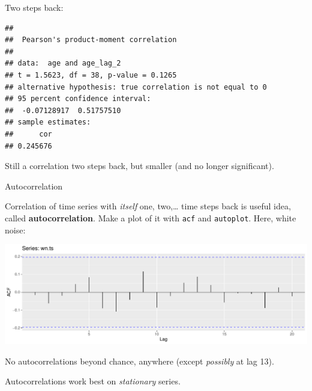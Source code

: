 \documentclass[
  ignorenonframetext,
]{beamer}
\newenvironment{Shaded}{\begin{snugshade}}{\end{snugshade}}
\newcommand{\DataTypeTok}[1]{\textcolor[rgb]{0.13,0.29,0.53}{#1}}
\newcommand{\DecValTok}[1]{\textcolor[rgb]{0.00,0.00,0.81}{#1}}
\newcommand{\KeywordTok}[1]{\textcolor[rgb]{0.13,0.29,0.53}{\textbf{#1}}}
\newcommand{\NormalTok}[1]{#1}
\newcommand{\OperatorTok}[1]{\textcolor[rgb]{0.81,0.36,0.00}{\textbf{#1}}}
\newcommand{\StringTok}[1]{\textcolor[rgb]{0.31,0.60,0.02}{#1}}
\begin{document}
\begin{frame}[fragile]{Two steps back:}
\protect\hypertarget{two-steps-back}{}

\small

\begin{Shaded}
\end{Shaded}

\begin{verbatim}
## 
##  Pearson's product-moment correlation
## 
## data:  age and age_lag_2
## t = 1.5623, df = 38, p-value = 0.1265
## alternative hypothesis: true correlation is not equal to 0
## 95 percent confidence interval:
##  -0.07128917  0.51757510
## sample estimates:
##      cor 
## 0.245676
\end{verbatim}

\normalsize

Still a correlation two steps back, but smaller (and no longer
significant).

\end{frame}

\begin{frame}[fragile]{Autocorrelation}
\protect\hypertarget{autocorrelation}{}

Correlation of time series with \emph{itself} one, two,\ldots{} time
steps back is useful idea, called \textbf{autocorrelation}. Make a plot
of it with \texttt{acf} and \texttt{autoplot}. Here, white noise:

\begin{Shaded}
\end{Shaded}

\includegraphics{slides_d29_files/figure-beamer/unnamed-chunk-539-1.pdf}

No autocorrelations beyond chance, anywhere (except \emph{possibly} at
lag 13).

Autocorrelations work best on \emph{stationary} series.

\end{frame}
\end{document}

